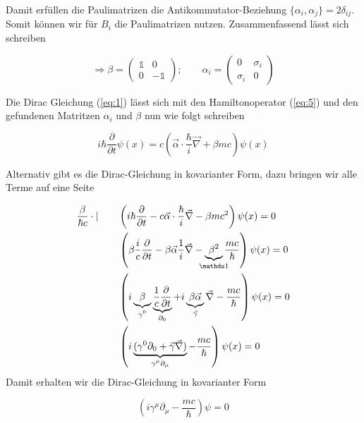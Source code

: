 Damit erfüllen die Paulimatrizen die Antikommutator-Beziehung  \(\{\alpha_i,\alpha_j\} =2\delta_{ij} \). Somit können wir für \(B_i\) die Paulimatrizen nutzen. Zusammenfassend lässt sich schreiben

\begin{equation}
  \label{eq:15}
  \Rightarrow \boxed{ \beta= \begin{pmatrix}\mathbb 1&0\\ 0&-\mathbb 1\end{pmatrix};\qquad \alpha_i=\begin{pmatrix} 0&\sigma_i\\ \sigma_i&0\end{pmatrix} }
\end{equation}


Die Dirac Gleichung (\ref{eq:1}) lässt sich mit den Hamiltonoperator (\ref{eq:5}) und den gefundenen Matritzen \(\alpha_i\) und \(\beta\) nun wie folgt schreiben

\begin{equation}
  \label{eq:16}
  \boxed{i\hbar \frac{\partial}{\partial t}\psi(x) = c\left(\vec \alpha\cdot\frac{\hbar}{i}\vec \nabla + \beta mc\right)\psi(x)}
\end{equation}


Alternativ gibt es die Dirac-Gleichung in kovarianter Form, dazu bringen wir alle Terme auf eine Seite


\begin{align}
  \label{eq:20}
 \frac{\beta}{\hbar c} \cdot| \qquad  &\left( i\hbar \frac{\partial}{\partial t} - c \vec \alpha\cdot\frac{\hbar}{i}\vec \nabla - \beta mc^2 \right)\psi(x) = 0  \notag \\
 &\left( \beta\frac{i}{c} \frac{\partial}{\partial t} - \beta\vec\alpha\frac{1}{i}\vec \nabla  - \underbr{\beta^2}_{\mathds 1} \frac{mc}{\hbar } \right)\psi(x) = 0 \notag\\
 &\left( i \underbr{ \beta}_{\gamma^0}  \underbr{ \frac{1}{c} \frac{\partial}{\partial t}}_{\partial_0} + i\underbr{ \beta \vec \alpha }_{\vec \gamma}\vec \nabla -  \frac{mc}{\hbar } \right)\psi(x) = 0 \notag\\
 &\left( i \underbr{(\gamma^0  \partial_0 + \vec \gamma \vec \nabla)}_{\gamma^\mu\partial_\mu} -  \frac{mc}{\hbar } \right)\psi(x) = 0 \notag\\
\end{align}
Damit erhalten wir die Dirac-Gleichung in kovarianter Form

\begin{equation}
  \label{eq:17}
  \boxed{\left(i\gamma^\mu\partial_\mu - \frac{mc}{\hbar}\right)\psi=0}
\end{equation}


